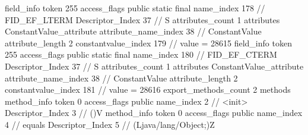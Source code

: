 {{{{{{{				}
				}
			}
			field_info {
				token	255
				access_flags	public static final
				name_index	178		// FID_EF_LTERM
				Descriptor_Index	37		// S
				attributes_count	1
				attributes {
				ConstantValue_attribute {
					attribute_name_index	38		// ConstantValue
					attribute_length	2
					constantvalue_index	179		// value = 28615
				}
				}
			}
			field_info {
				token	255
				access_flags	public static final
				name_index	180		// FID_EF_CTERM
				Descriptor_Index	37		// S
				attributes_count	1
				attributes {
				ConstantValue_attribute {
					attribute_name_index	38		// ConstantValue
					attribute_length	2
					constantvalue_index	181		// value = 28616
				}
				}
			}
			}
			export_methods_count	2
			methods {
				method_info {
					token	0
					access_flags	public
					name_index	2		// <init>
					Descriptor_Index	3		// ()V
				}
				method_info {
					token	0
					access_flags	public
					name_index	4		// equals
					Descriptor_Index	5		// (Ljava/lang/Object;)Z
				}
			}
		}
	}
}
